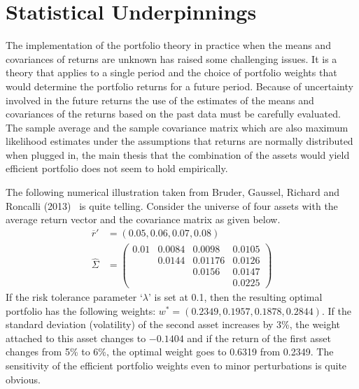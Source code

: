 \section{Statistical Underpinnings \label{s:stat_under}}


The implementation of the portfolio theory in practice when the means and covariances of returns are unknown has raised some challenging issues. It is a theory that applies to a single period and the choice of portfolio weights that would determine the portfolio returns for a future period. Because of uncertainty involved in the future returns the use of the estimates of the means and covariances of the returns based on the past data must be carefully evaluated. The sample average and the sample covariance matrix which are also maximum likelihood estimates under the assumptions that returns are normally distributed when plugged in, the main thesis that the combination of the assets would yield efficient portfolio does not seem to hold empirically. 


The following numerical illustration taken from Bruder, Gaussel, Richard and Roncalli (2013)~\cite{bruder} is quite telling. Consider the universe of four assets with the average return vector and the covariance matrix as given below.
	\begin{equation}\label{eqn:ovrsighat}
	\begin{split}
	\overline{r}'&= (0.05, 0.06, 0.07, 0.08) \\
	\hat{\Sigma}&=\begin{pmatrix}
	0.01 & 0.0084 & 0.0098 & 0.0105 \\
	        & 0.0144 & 0.01176 & 0.0126 \\
	        &             & 0.0156 & 0.0147 \\
	        &             &             & 0.0225
	\end{pmatrix}
	\end{split}
	\end{equation}
If the risk tolerance parameter `$\lambda$' is set at 0.1, then the resulting optimal portfolio has the following weights: $w^*=(0.2349, 0.1957, 0.1878, 0.2844)$. If the standard deviation (volatility) of the second asset increases by 3\%, the weight attached to this asset changes to $-0.1404$ and if the return of the first asset changes from 5\% to 6\%, the optimal weight goes to 0.6319 from 0.2349. The sensitivity of the efficient portfolio weights even to minor perturbations is quite obvious. 


